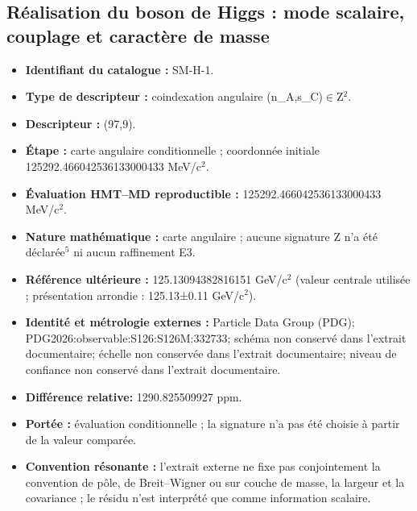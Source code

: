\subsection{Réalisation du boson de Higgs : mode scalaire, couplage et caractère de masse}
\begin{itemize}
\item \textbf{Identifiant du catalogue :} SM-H-1.
\item \textbf{Type de descripteur :} coindexation angulaire (n\_A,s\_C)\(\in\)Z\({}^{2}\).
\item \textbf{Descripteur :} (97,9).
\item \textbf{Étape :} carte angulaire conditionnelle ; coordonnée initiale 125292.466042\allowbreak{}536133\allowbreak{}000433 MeV/c\({}^{2}\).
\item \textbf{Évaluation HMT--MD reproductible :} 125292.466042\allowbreak{}536133\allowbreak{}000433 MeV/c\({}^{2}\).
\item \textbf{Nature mathématique :} carte angulaire ; aucune signature Z n’a été déclarée\({}^{5}\) ni aucun raffinement E3.
\item \textbf{Référence ultérieure :} 125.130943\allowbreak{}828161\allowbreak{}51 GeV/c\({}^{2}\) (valeur centrale utilisée ; présentation arrondie : 125.13±\allowbreak{}0.11 GeV/c\({}^{2}\)).
\item \textbf{Identité et métrologie externes :} Particle Data Group (PDG); PDG2026:\allowbreak{}observable:\allowbreak{}S126:\allowbreak{}S126M:\allowbreak{}332733; schéma non conservé dans l’extrait documentaire; échelle non conservée dans l’extrait documentaire; niveau de confiance non conservé dans l’extrait documentaire.
\item \textbf{Différence relative:} 1290.825509\allowbreak{}927 ppm.
\item \textbf{Portée :} évaluation conditionnelle ; la signature n’a pas été choisie à partir de la valeur comparée.
\item \textbf{Convention résonante :} l’extrait externe ne fixe pas conjointement la convention de pôle, de Breit--Wigner ou sur couche de masse, la largeur et la covariance ; le résidu n’est interprété que comme information scalaire.
\end{itemize}
